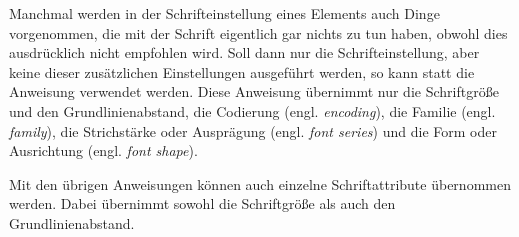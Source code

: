 \begin{Declaration}
\end{Declaration}
Manchmal werden in der Schrifteinstellung
eines Elements auch Dinge vorgenommen, die mit der Schrift eigentlich gar
nichts zu tun haben, obwohl dies ausdrücklich nicht empfohlen wird. Soll dann
nur die Schrifteinstellung, aber keine dieser zusätzlichen Einstellungen
ausgeführt werden, so kann statt
 die Anweisung
 verwendet werden. Diese Anweisung übernimmt nur die
Schriftgröße und den Grundlinienabstand, die Codierung
(engl. \emph{encoding}), die Familie (engl. \emph{family}), die Strichstärke
oder Ausprägung (engl. \emph{font series}) und die Form oder Ausrichtung
(engl. \emph{font shape}).

Mit den übrigen Anweisungen können auch einzelne Schriftattribute
übernommen werden. Dabei übernimmt  sowohl die
Schriftgröße als auch den Grundlinienabstand.%
%
%
\EndIndexGroup
%
\EndIndexGroup

